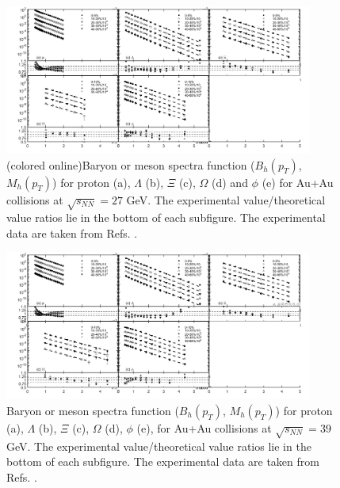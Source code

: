 \documentclass[twocolumn,aps,superscriptaddress,showpacs,nofootinbib,floatfix]{revtex4}
\begin{document}
\begin{figure}[pht]
	\includegraphics[width=0.9\textwidth]{pic5.png}
	\caption{(colored online)Baryon or meson spectra function ($B_h(p_T)$, $M_h(p_T)$) for proton (a), $\Lambda$ (b), $\Xi$ (c), $\Omega$ (d) and $\phi$ (e) for Au+Au collisions at $\sqrt{s_{NN}}=27$ GeV. The experimental value/theoretical value ratios lie in the bottom of each subfigure. The experimental data are taken from Refs. \cite{STAR:2019bjj,STAR:2017sal,STAR:2015vvs}.}
	\label{fig5}
\end{figure}

\begin{figure}[pht]
	\includegraphics[width=0.9\textwidth]{pic6.png}
	\caption{Baryon or meson spectra function ($B_h(p_T)$, $M_h(p_T)$) for proton (a), $\Lambda$ (b), $\Xi$ (c), $\Omega$ (d), $\phi$ (e), for Au+Au collisions at $\sqrt{s_{NN}}=39$ GeV. The experimental value/theoretical value ratios lie in the bottom of each subfigure. The experimental data are taken from Refs. \cite{STAR:2019bjj,STAR:2017sal,STAR:2015vvs}.}
	\label{fig6}
\end{figure}
\end{document}
